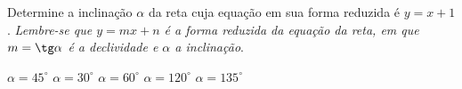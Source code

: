 Determine a inclinação $\alpha$ da reta cuja equação em sua forma reduzida é $y=x+1$. \textit{Lembre-se que $y=mx+n$ é a forma reduzida da equação da reta, em que $m=\tg\alpha$ é a declividade e $\alpha$ a inclinação}.

$\alpha=45^\circ$
$\alpha=30^\circ$
$\alpha=60^\circ$
$\alpha=120^\circ$
$\alpha=135^\circ$






